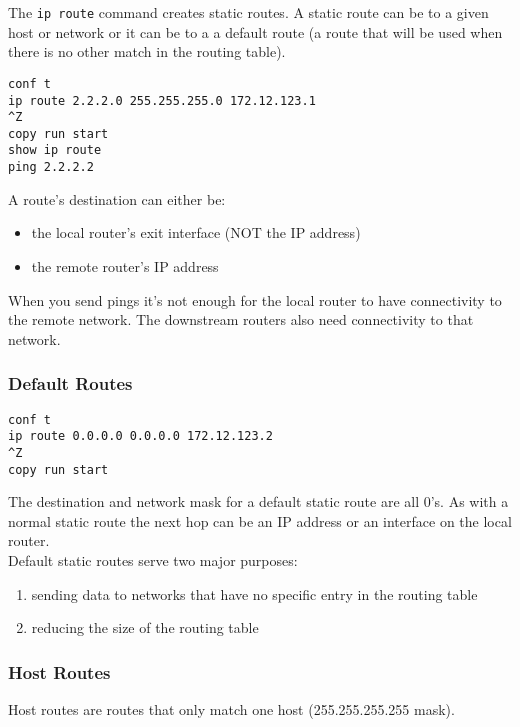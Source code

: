 The \texttt{ip route} command creates static routes. A static route can
be to a given host or network or it can be to a a default route (a route that
will be used when there is no other match in the routing table).

\begin{verbatim}
conf t
ip route 2.2.2.0 255.255.255.0 172.12.123.1
^Z
copy run start
show ip route
ping 2.2.2.2
\end{verbatim}

A route's destination can either be:

\begin{itemize}
\item the local router's exit interface (NOT the IP address)
\item the remote router's IP address
\end{itemize}

When you send pings it's not enough for the local router to have connectivity
to the remote network. The downstream routers also need connectivity to that
network.

\subsubsection{Default Routes}

\begin{verbatim}
conf t
ip route 0.0.0.0 0.0.0.0 172.12.123.2
^Z
copy run start
\end{verbatim}

The destination and network mask for a default static route are all 0's.
As with a normal static route the next hop can be an IP address or an
interface on the local router.\\

Default static routes serve two major purposes:

\begin{enumerate}
\item sending data to networks that have no specific entry in the routing
table
\item reducing the size of the routing table
\end{enumerate}

\subsubsection{Host Routes}

Host routes are routes that only match one host (255.255.255.255 mask).

